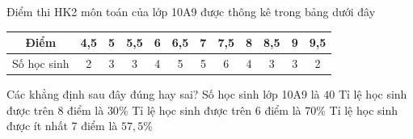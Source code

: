 

\begin{ex}%
	 Điểm thi HK2 môn toán của lớp 10A9 được thông kê trong bảng dưới đây
	\begin{center}
		\begin{tabular}{|c|c|c|c|c|c|c|c|c|c|c|c|}
			\hline 
			Điểm & 4,5 & 5 & 5,5 & 6 & 6,5 & 7 & 7,5 &  8 & 8,5 & 9 & 9,5\\
			 \hline
			 Số học sinh & 2 & 3 & 3 & 4 & 5 & 5 & 6 & 4 & 3 & 3 & 2\\
			\hline 
		\end{tabular}
	\end{center}
	Các khẳng định sau  đây đúng hay sai?
	\choiceTF 
		{\True Số học sinh lớp  10A9 là $40$}
		{Tỉ lệ học sinh được trên 8 điểm  là $30\%$}
		{\True Tỉ lệ học  sinh được trên 6 điểm là $70\%$}
		{\True Tỉ lệ học sinh được ít nhất  7 điểm là $57{,}5\%$}
\end{ex}

